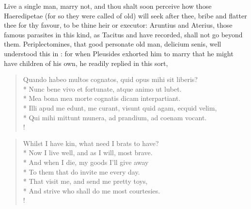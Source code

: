 Live a single man, marry not, and thou shalt soon perceive how those
Haeredipetae (for so they were called of old) will seek after thee,
bribe and flatter thee for thy favour, to be thine heir or executor:
Aruntius and Aterius, those famous parasites in this kind, as Tacitus
and \Seneca{} have recorded, shall not go beyond them.
Periplectomines, that good personate old man, delicium senis, well
understood this in \Plautus{}: for when Pleusides exhorted him to marry
that he might have children of his own, he readily replied in this
sort,
%
\begin{latin}%
\begin{verse}%
Quando habeo multos cognatos, quid opus mihi sit liberis?\\*
Nunc bene vivo et fortunate, atque animo ut lubet.\\*
Mea bona mea morte cognatis dicam interpartiant.\\*
Illi apud me edunt, me curant, visunt quid agam, ecquid velim,\\*
Qui mihi mittunt munera, ad prandium, ad coenam vocant.\\!
\end{verse}%
\end{latin}%
\translationrule%
\begin{verse}%
Whilst I have kin, what need I brats to have?\\*
Now I live well, and as I will, most brave.\\*
And when I die, my goods I'll give away\\*
To them that do invite me every day.\\*
That visit me, and send me pretty toys,\\*
And strive who shall do me most courtesies.\\!
\end{verse}%

